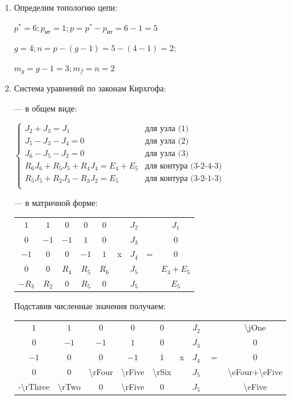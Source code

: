 \documentclass[12pt]{article}
\begin{document}
		\begin{enumerate}
			\item Определим топологию цепи:	
					
			$p^*=6; p_{нт}=1; p=p^*-p_{нт}=6-1=5$		
				
			$g=4; n=p-(g-1)=5-(4-1)=2;$		
				
			$m_g=g-1=3; m_f=n=2$ 
			
			\item Система уравнений по законам Кирхгофа:
			
			 --- в общем виде: 
			
			$\begin{cases}
				J_2+J_3=J_1 						&\text{для узла (1)} 			\\
				J_5-J_3-J_4=0						&\text{для узла (2)} 			\\
				J_6-J_5-J_2=0						&\text{для узла (3)} 			\\
				R_6 J_6 + R_5 J_5 + R_4 J_4 = E_4 + E_5	&\text{для контура (3-2-4-3)}	\\	
				R_5 J_5 + R_2 J_3 - R_3 J_2= E_5		&\text{для контура (3-2-1-3)} 	\\
			\end{cases}$
			
			--- в матричной форме:
			
			\begin{tabular}{|ccccc|c|c|c|c|}
				$1$		&	$1$		&	$0$		& 	$0$		&	$0$		&		&	$J_2$	&		&	$J_1$		\\
				$0$		&	$-1$		&	$-1$		& 	$1$		&	$0$		&		&	$J_3$	&		&	$0$			\\
				$-1$		&	$0$		&	$0$		& 	$-1$		&	$1$		&	x	&	$J_4$	&	=	&	$0$			\\
				$0$		&	$0$		&	$R_4$	& 	$R_5$	&	$R_6$	&		&	$J_5$	&		&	$E_4+E_5$	\\
				$-R_3$	&	$R_2$	&	$0$		& 	$R_5$	&	$0$		&		&	$J_5$	&		&	$E_5$		\\
			\end{tabular}
			\newpage
			Подставив численные значения получаем: 
			
			\begin{tabular}{|ccccc|c|c|c|c|}
				$1$			&	$1$			&	$0$			& 	$0$				&	$0$			&		&	$J_2$	&		&	\num{\jOne}				\\
				$0$			&	$-1$			&	$-1$			& 	$1$				&	$0$			&		&	$J_3$	&		&	$0$						\\
				$-1$			&	$0$			&	$0$			& 	$-1$				&	$1$			&	x	&	$J_4$	&    $=$	&	$0$						\\
				$0$			&	$0$			&	\num{\rFour}	& 	\num{\rFive}		&	\num{\rSix}	&		&	$J_5$	&		&	\num{\eFour}$+$\num{\eFive}	\\
			  \num{-\rThree}	&	\num{\rTwo}	&	$0$			& 	\num{\rFive}		&	$0$			&		&	$J_5$	&		&	\num{\eFive}				\\		
			\end{tabular}
			

\end{enumerate}
\end{document}
